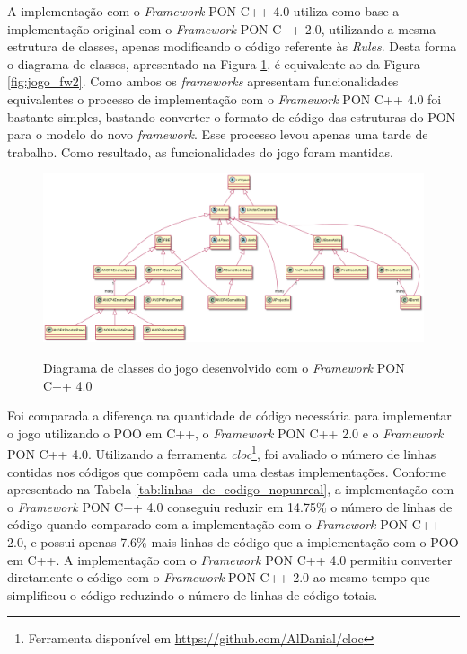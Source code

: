 A implementação com o \textit{Framework} PON C++ 4.0 utiliza
como base a implementação original com o \textit{Framework} PON C++ 2.0,
utilizando a mesma estrutura de classes, apenas modificando o código referente
às \textit{Rules}. Desta forma o diagrama de classes, apresentado na Figura
\ref{fig:jogo_fw4}, é equivalente ao da Figura \ref{fig:jogo_fw2}. 
Como ambos os \textit{frameworks} apresentam funcionalidades equivalentes o
processo de implementação com o \textit{Framework} PON C++ 4.0 foi bastante
simples, bastando converter o formato de código das estruturas do PON para o
modelo do novo \textit{framework}. Esse processo levou apenas uma tarde de
trabalho. Como resultado, as funcionalidades do jogo foram mantidas.

\begin{figure}[!htb]
\centering
\caption{Diagrama de classes do jogo desenvolvido com o \textit{Framework} PON
C++ 4.0 }
\includegraphics[width=\textwidth]{../out/diagrams/class_diagram_nop4/NOP4Unreal.png}
\smallskip
{}
\label{fig:jogo_fw4}
\end{figure}

Foi comparada a diferença na quantidade de código necessária para implementar o
jogo utilizando o POO em C++, o \textit{Framework} PON C++ 2.0 e o
\textit{Framework} PON C++ 4.0. Utilizando a ferramenta
\textit{cloc}\footnote{Ferramenta disponível em
\url{https://github.com/AlDanial/cloc}}, foi avaliado o número de linhas
contidas nos códigos que compõem cada uma destas implementações. Conforme
apresentado na Tabela \ref{tab:linhas_de_codigo_nopunreal}, a implementação com
o \textit{Framework} PON C++ 4.0 conseguiu reduzir em 14.75\% o número de linhas
de código quando comparado com a implementação com o \textit{Framework} PON C++
2.0, e possui apenas 7.6\% mais linhas de código que a implementação com o POO
em C++. A implementação com o \textit{Framework} PON C++ 4.0 permitiu converter
diretamente o código com o \textit{Framework} PON C++ 2.0 ao mesmo tempo que
simplificou o código reduzindo o número de linhas de código totais.

